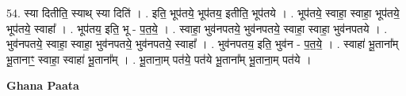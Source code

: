 \documentclass[17pt]{extarticle}
\begin{document}
54. स्या दितीति॒ स्याथ् स्या दिति॑ । . इति॒ भूप॑तये॒ भूप॑तय॒ इतीति॒ भूप॑तये । . भूप॑तये॒ स्वाहा॒ स्वाहा॒ भूप॑तये॒ भूप॑तये॒ स्वाहा᳚ । . भूप॑तय॒ इति॒ भू - प॒त॒ये॒ । . स्वाहा॒ भुव॑नपतये॒ भुव॑नपतये॒ स्वाहा॒ स्वाहा॒ भुव॑नपतये । . भुव॑नपतये॒ स्वाहा॒ स्वाहा॒ भुव॑नपतये॒ भुव॑नपतये॒ स्वाहा᳚ । . भुव॑नपतय॒ इति॒ भुव॑न - प॒त॒ये॒ । . स्वाहा॑ भू॒ताना᳚म् भू॒तानाꣳ॒॒ स्वाहा॒ स्वाहा॑ भू॒ताना᳚म् । . भू॒ताना॒म् पत॑ये॒ पत॑ये भू॒ताना᳚म् भू॒ताना॒म् पत॑ये । \newline

\textbf{Ghana Paata } \newline
\end{document}
